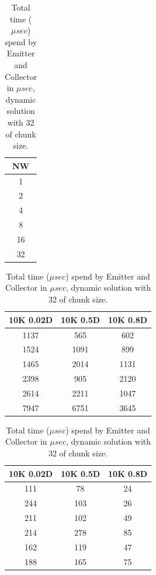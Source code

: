 \begin{table}[!htb]
\centering
\begin{minipage}{0.08\textwidth}
\centering
\begin{tabular}{|c|}
\hline
NW \\ \hline
1          \\ \hline
2      \\ \hline
4           \\ \hline
8            \\ \hline
16       \\ \hline
32          \\ \hline
\end{tabular}
\end{minipage}
\begin{minipage}{0.43\textwidth}
\centering
\begin{tabular}{|c|c|c|}
\hline
10K 0.02D & 10K 0.5D & 10K 0.8D \\ \hline
1137       & 565      & 602      \\ \hline
1524       & 1091     & 899      \\ \hline
1465       & 2014     & 1131     \\ \hline
2398      & 905      & 2120     \\ \hline
2614      & 2211     & 1047     \\ \hline
7947      & 6751     & 3645     \\ \hline
\end{tabular}
\end{minipage}
\begin{minipage}{0.43\textwidth}
\centering
\begin{tabular}{|c|c|c|}
\hline
10K 0.02D & 10K 0.5D & 10K 0.8D \\ \hline
111       & 78       & 24       \\ \hline
244       & 103      & 26       \\ \hline
211       & 102      & 49       \\ \hline
214       & 278      & 85       \\ \hline
162       & 119      & 47       \\ \hline
188       & 165      & 75       \\ \hline
\end{tabular}
\end{minipage}
\caption{Total time ($\mu sec$) spend by Emitter and Collector in $\mu sec$, dynamic solution with 32 of chunk size.}
\label{table:emit_coll_dy}
\end{table}
\FloatBarrier


